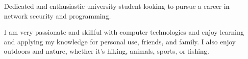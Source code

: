 


\begin{cvparagraph}

Dedicated and enthusiastic university student looking to pursue
a career in network security and programming. 
\end{cvparagraph}



\begin{cvparagraph}

I am very passionate and skillful with computer technologies and enjoy
learning and applying my knowledge for personal use, friends, and family.
I also enjoy outdoors and nature, whether it's hiking, animals, sports, or fishing.
\end{cvparagraph}

